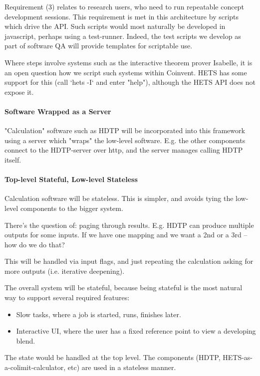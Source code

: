 \documentclass[10pt]{article}
\begin{document}
Requirement (3) relates to research users, who need to run repeatable concept development sessions. This requirement is met in this architecture by scripts which drive the API. Such scripts would most naturally be developed in javascript, perhaps using a test-runner. Indeed, the test scripts we develop as part of software QA will provide templates for scriptable use.

Where steps involve systems such as the interactive theorem prover Isabelle, it is an open question how we script such systems within Coinvent. HETS
has some support for this (call `hets -I` and enter "help"), 
although the HETS API does not expose it.

\paragraph{Software Wrapped as a Server}

"Calculation" software such as HDTP will be incorporated into this framework using a server which "wraps" the low-level software. E.g. the other components connect to the HDTP-server over http, and the server manages calling HDTP itself.


\paragraph{Top-level Stateful, Low-level Stateless}

Calculation software will be stateless. This is simpler, and avoids tying the
low-level components to the bigger system.

There's the question of: paging through results.
E.g. HDTP can produce multiple outputs for some inputs.
If we have one mapping and we want a 2nd or a 3rd -- how do we do that?   

This will be handled via input flags, and just repeating
the calculation asking for more outputs (i.e. iterative deepening).

The overall system will be stateful, because being stateful is the
most natural way to support several required features:
\begin{itemize}
\item Slow tasks, where a job is started, runs, finishes later.
\item Interactive UI, where the user has a fixed reference point to view
a developing blend.
\end{itemize}
The state would be handled at the top level. The components
(HDTP, HETS-as-a-colimit-calculator, etc) are used in a stateless manner.
\end{document}
